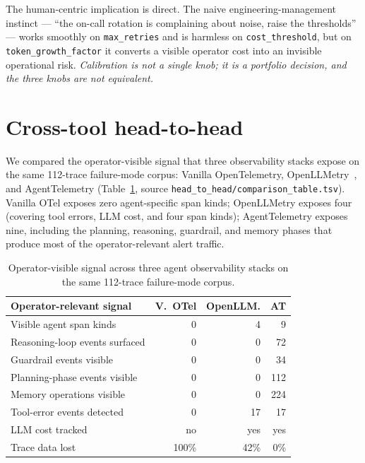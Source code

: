 \documentclass[journal]{IEEEtran}
\begin{document}
The human-centric implication is direct. The naive engineering-management instinct --- ``the on-call rotation is complaining about noise, raise the thresholds'' --- works smoothly on \texttt{max\_retries} and is harmless on \texttt{cost\_threshold}, but on \texttt{token\_growth\_factor} it converts a visible operator cost into an invisible operational risk. \emph{Calibration is not a single knob; it is a portfolio decision, and the three knobs are not equivalent.}

\section{Cross-tool head-to-head}

We compared the operator-visible signal that three observability stacks expose on the same 112-trace failure-mode corpus: Vanilla OpenTelemetry, OpenLLMetry~\cite{openllmetry}, and AgentTelemetry (Table~\ref{tab:h2h}, source \texttt{head\_to\_head/comparison\_table.tsv}). Vanilla OTel exposes zero agent-specific span kinds; OpenLLMetry exposes four (covering tool errors, LLM cost, and four span kinds); AgentTelemetry exposes nine, including the planning, reasoning, guardrail, and memory phases that produce most of the operator-relevant alert traffic.

\begin{table}[t]
\centering
\caption{Operator-visible signal across three agent observability stacks on the same 112-trace failure-mode corpus.}
\label{tab:h2h}
\small
\begin{tabular}{@{}lrrr@{}}
\toprule
\textbf{Operator-relevant signal} & \textbf{V.\ OTel} & \textbf{OpenLLM.} & \textbf{AT} \\
\midrule
Visible agent span kinds & 0 & 4 & 9 \\
Reasoning-loop events surfaced & 0 & 0 & 72 \\
Guardrail events visible & 0 & 0 & 34 \\
Planning-phase events visible & 0 & 0 & 112 \\
Memory operations visible & 0 & 0 & 224 \\
Tool-error events detected & 0 & 17 & 17 \\
LLM cost tracked & no & yes & yes \\
Trace data lost & 100\% & 42\% & 0\% \\
\bottomrule
\end{tabular}
\end{table}
\end{document}
